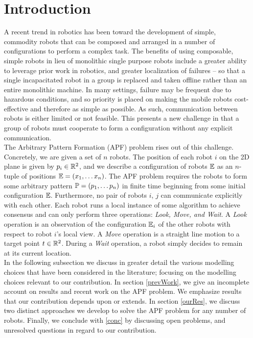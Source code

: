 \documentclass[preprint,10pt]{elsarticle}
\begin{document}
\section{Introduction}
A recent trend in robotics has been toward the development of simple, commodity robots that can
be composed and arranged in a number of configurations to perform a complex task. The benefits of using composable,
simple robots in lieu of monolithic single purpose robots include a greater ability to leverage prior work in
robotics, and greater localization of failures -- so that a single incapacitated robot in a group is replaced
and taken offline rather than an entire monolithic machine. In many settings, failure may be frequent due to 
hazardous conditions, and so priority is placed on making the mobile robots cost-effective and therefore 
as simple as possible. As such, communication between robots is either limited or not feasible. This presents a
new challenge in that a group of robots must cooperate to form a configuration without any explicit communication. \\

The Arbitrary Pattern Formation (APF) problem rises out of this challenge. Concretely, we are given
a set of $n$ robots. The position of each robot $i$ on the 2D plane is given by $p_i \in \mathbb{R}^2$, and we
describe a configuration of robots $\mathbb{E}$ as an $n$-tuple of positions $\mathbb{E} = (x_1, \ldots x_n)$.
The APF problem requires the robots to form some arbitrary pattern $\mathbb{P} = (p_1, \ldots p_n)$ in finite
time beginning from some initial configuration $\mathbb{E}$. Furthermore, no pair of robots $i$, $j$ can 
communicate explicitly with each other. Each robot runs a local instance of some algorithm to
achieve consensus and can only perform three operations: \textit{Look, Move, and Wait}. A \textit{Look}
operation is an observation of the configuration $\mathbb{E}_i$ of the other robots with respect to robot
$i$'s local view. A \textit{Move} operation is a straight line motion to a target point $t \in \mathbb{R}^2$.
During a \textit{Wait} operation, a robot simply decides to remain at its current location. \\

In the following subsection we discuss in greater detail the various modelling choices that have been
considered in the literature; focusing on the modelling choices relevant to our contribution. In
section \ref{prevWork}, we give an incomplete account on results and recent work on the APF problem. We
emphasize results that our contribution depends upon or extends. In section \ref{ourRes}, we discuss
two distinct approaches we develop to solve the APF problem for any number of robots. Finally,
we conclude with \ref{conc} by discussing open problems, and unresolved questions in regard to our contribution.
\end{document}
